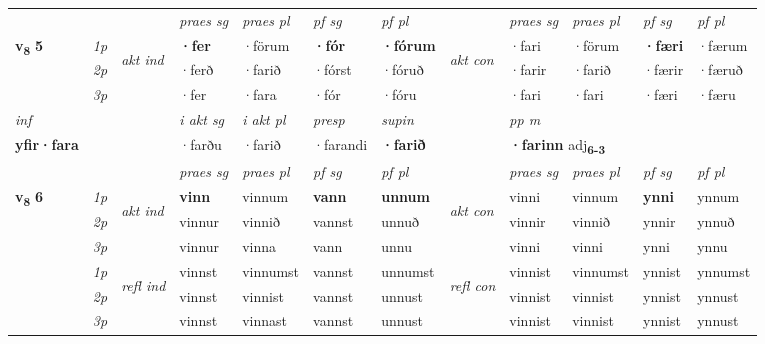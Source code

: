 \begin{longtable}[l]{X>{\footnotesize\itshape}llXXXXlXXXX}
 & &   & \textit{praes sg}  & \textit{praes pl}    & \textit{ pf sg} & \textit{pf pl} & & \textit{praes sg}  & \textit{praes pl}    & \textit{pf sg} & \textit{pf pl }  \\ \cmidrule{4-7} \cmidrule{9-12}
 \multirow{2}{*}{{{\textbf{v{\textsubscript{8}}} \Large{\textbf{5}}}}}  & 1p & \multirow{3}{*}{\begin{turn}{90}\textit{akt ind}\end{turn}} & \textbf{·fer} & ·förum & \textbf{·fór} & \textbf{·fórum} & \multirow{3}{*}{\begin{turn}{90}\textit{akt con}\end{turn}} &·fari & ·förum & \textbf{·færi} & ·færum\\*
 & 2p &  &  ·ferð  & ·farið & ·fórst & ·fóruð & & ·farir & ·farið & ·færir & ·færuð \\*
 & 3p &  & ·fer & ·fara & ·fór & ·fóru & & ·fari & ·fari& ·færi & ·færu \\*
\cmidrule{4-7} \cmidrule{9-12}

   {\textit{inf}} & &  & \textit{i akt sg} & \textit{i akt pl}   & \textit{presp} & \textit{supin}  && \textit{pp m} \\*
  {\textbf{yfir\allowbreak ·fara}} & && ·farðu  & ·farið   & ·farandi &  \textbf{·farið}  && \multicolumn{2}{l}{\textbf{·farinn} adj\textbf{\textsubscript{6-3}}} \\*

\midrule

 & &   & \textit{praes sg}  & \textit{praes pl}    & \textit{ pf sg} & \textit{pf pl} & & \textit{praes sg}  & \textit{praes pl}    & \textit{pf sg} & \textit{pf pl }  \\ \cmidrule{4-7} \cmidrule{9-12}
 \multirow{2}{*}{{{\textbf{v{\textsubscript{8}}} \Large{\textbf{6}}}}}  & 1p & \multirow{3}{*}{\begin{turn}{90}\textit{akt ind}\end{turn}} & \textbf{vinn} & vinnum & \textbf{vann} & \textbf{unnum} & \multirow{3}{*}{\begin{turn}{90}\textit{akt con}\end{turn}} &vinni & vinnum & \textbf{ynni} & ynnum\\*
 & 2p &  &  vinnur  & vinnið & vannst & unnuð & & vinnir & vinnið & ynnir & ynnuð \\*
 & 3p &  & vinnur & vinna & vann & unnu & & vinni & vinni& ynni & ynnu \\*
\cmidrule{4-7} \cmidrule{9-12}
 & 1p & \multirow{3}{*}{\begin{turn}{90}\textit{refl ind}\end{turn}}  & vinnst & vinnumst & vannst & unnumst & \multirow{3}{*}{\begin{turn}{90}\textit{refl con}\end{turn}}  &vinnist & vinnumst & ynnist & ynnumst \\*
 & 2p &  & vinnst & vinnist & vannst & unnust & &vinnist & vinnist & ynnist & ynnust \\*
 & 3p  & & vinnst & vinnast & vannst & unnust & & vinnist & vinnist& ynnist & ynnust \\*
\cmidrule{4-7} \cmidrule{9-12}


\end{longtable}
